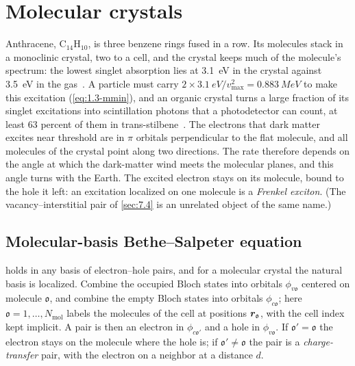 \section{Molecular crystals}\label{sec:16.4}

Anthracene, C$_{14}$H$_{10}$, is three benzene rings fused in a row. Its molecules stack in a monoclinic crystal, two to a cell, and the crystal keeps much of the molecule's spectrum: the lowest singlet absorption lies at \SI{3.1}{eV} in the crystal against \SI{3.5}{eV} in the gas~\cite[Tables~I and~III]{rangel2016structural}. A particle must carry $2\times\SI{3.1}{eV}/v_{\mathrm{max}}^2 = \SI{0.883}{MeV}$ to make this excitation (\cref{eq:1.3-mmin}), and an organic crystal turns a large fraction of its singlet excitations into scintillation photons that a photodetector can count, at least 63 percent of them in trans-stilbene~\cite[Sect.~IV\,B]{blanco2021dark}. The electrons that dark matter excites near threshold are in $\pi$ orbitals perpendicular to the flat molecule, and all molecules of the crystal point along two directions. The rate therefore depends on the angle at which the dark-matter wind meets the molecular planes, and this angle turns with the Earth. The excited electron stays on its molecule, bound to the hole it left: an excitation localized on one molecule is a \emph{Frenkel exciton}. (The vacancy--interstitial pair of \cref{sec:7.4} is an unrelated object of the same name.)

\subsection{Molecular-basis Bethe--Salpeter equation}\label{sec:16.4-bse}

 holds in any basis of electron--hole pairs, and for a molecular crystal the natural basis is localized. Combine the occupied Bloch states into orbitals $\phi_{v\mathfrak{o}}$ centered on molecule $\mathfrak{o}$, and combine the empty Bloch states into orbitals $\phi_{c\mathfrak{o}}$; here $\mathfrak{o} = 1,\dots,N_{\mathrm{mol}}$ labels the molecules of the cell at positions $\bm{r}_{\mathfrak{o}}$, with the cell index kept implicit. A pair is then an electron in $\phi_{c\mathfrak{o}'}$ and a hole in $\phi_{v\mathfrak{o}}$. If $\mathfrak{o}' = \mathfrak{o}$ the electron stays on the molecule where the hole is; if $\mathfrak{o}' \ne \mathfrak{o}$ the pair is a \emph{charge-transfer} pair, with the electron on a neighbor at a distance $d$.


